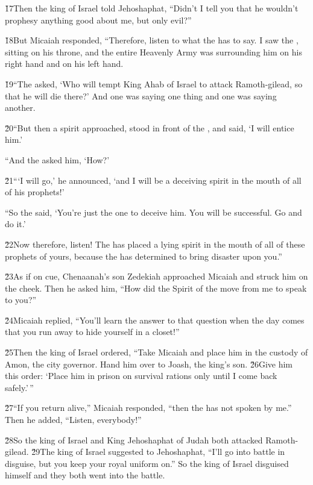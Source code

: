 \v{17}Then the king of Israel told Jehoshaphat, ``Didn't I tell you that he wouldn't prophesy anything good about me, but only evil?''

\v{18}But Micaiah responded, ``Therefore, listen to what the  has to say. I saw the , sitting on his throne, and the entire Heavenly Army was surrounding him on his right hand and on his left hand.

\v{19}``The  asked, `Who will tempt King Ahab of Israel to attack Ramoth-gilead, so that he will die there?' And one was saying one thing and one was saying another.

\v{20}``But then a spirit approached, stood in front of the , and said, `I will entice him.'

``And the  asked him, `How?'

\v{21}```I will go,' he announced, `and I will be a deceiving spirit in the mouth of all of his prophets!'

``So the  said, `You're just the one to deceive him. You will be successful. Go and do it.'

\v{22}Now therefore, listen! The  has placed a lying spirit in the mouth of all of these prophets of yours, because the  has determined to bring disaster upon you.''

\v{23}As if on cue, Chenaanah's son Zedekiah approached Micaiah and struck him on the cheek. Then he asked him, ``How did the Spirit of the  move from me to speak to you?''

\v{24}Micaiah replied, ``You'll learn the answer to that question when the day comes that you run away to hide yourself in a closet!''

\v{25}Then the king of Israel ordered, ``Take Micaiah and place him in the custody of Amon, the city governor. Hand him over to Joash, the king's son. \v{26}Give him this order: `Place him in prison on survival rations only until I come back safely.'\,''

\v{27}``If you return alive,'' Micaiah responded, ``then the  has not spoken by me.'' Then he added, ``Listen, everybody!''

\v{28}So the king of Israel and King Jehoshaphat of Judah both attacked Ramoth-gilead. \v{29}The king of Israel suggested to Jehoshaphat, ``I'll go into battle in disguise, but you keep your royal uniform on.'' So the king of Israel disguised himself and they both went into the battle.

